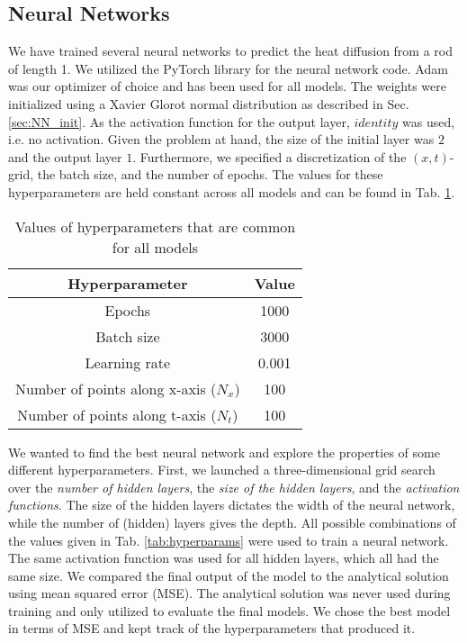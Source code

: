 \subsection{Neural Networks}

We have trained several neural networks to predict the heat diffusion from a rod of length 1.
We utilized the PyTorch library \cite{Ansel_PyTorch_2_Faster_2024} for the neural network code. 
Adam was our optimizer of choice and has been used for all models. 
The weights were initialized using a Xavier Glorot normal distribution as described in Sec. \ref{sec:NN_init}. 
As the activation function for the output layer, $identity$ was used, i.e. no activation. 
Given the problem at hand, the size of the initial layer was $2$ and the output layer $1$. 
Furthermore, we specified a discretization of the $(x,t)$-grid, the batch size, and the number of epochs. 
The values for these hyperparameters are held constant across all models and can be found in Tab. \ref{tab:valuesfornn}. 

\begin{table}[h!]
    \centering
    \begin{tabular}{|c|c|}
    \hline
        \textbf{Hyperparameter} & \textbf{Value}  \\ \hline
        Epochs & 1000  \\ \hline
        Batch size & 3000 \\\hline
        Learning rate & 0.001 \\ \hline
        Number of points along x-axis ($N_x$) & 100 \\ \hline
        Number of points along t-axis ($N_t$) & 100 \\ \hline
    \end{tabular}
    \caption{Values of hyperparameters that are common for all models}
    \label{tab:valuesfornn}
\end{table}



\mia{!!!!!}

We wanted to find the best neural network and explore the properties of some different hyperparameters. 
First, we launched a three-dimensional grid search over the \textit{number of hidden layers}, the \textit{size of the hidden layers}, and the \textit{activation functions}. 
The size of the hidden layers dictates the width of the neural network, while the number of (hidden) layers gives the depth. 
All possible combinations of the values given in Tab. \ref{tab:hyperparams} were used to train a neural network. 
The same activation function was used for all hidden layers, which all had the same size. 
We compared the final output of the model to the analytical solution using mean squared error (MSE). 
The analytical solution was never used during training and only utilized to evaluate the final models. 
We chose the best model in terms of MSE and kept track of the hyperparameters that produced it. 

